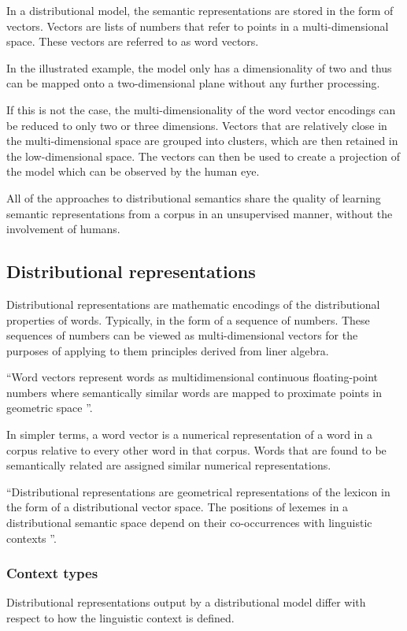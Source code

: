 \documentclass[14pt, a4paper]{extreport}
\begin{document}
In a distributional model, the semantic representations are stored in the form of vectors. Vectors are lists of numbers that refer to points in a multi-dimensional space. These vectors are referred to as word vectors.

In the illustrated example, the model only has a dimensionality of two and thus can be mapped onto a two-dimensional plane without any further processing.

If this is not the case, the multi-dimensionality of the word vector encodings can be reduced to only two or three dimensions. Vectors that are relatively close in the multi-dimensional space are grouped into clusters, which are then retained in the low-dimensional space. The vectors can then be used to create a projection of the model which can be observed by the human eye.

All of the approaches to distributional semantics share the quality of learning semantic representations from a corpus in an unsupervised manner, without the involvement of humans.
    \subsection{Distributional representations}
Distributional representations are mathematic encodings of the distributional properties of words. Typically, in the form of a sequence of numbers. These sequences of numbers can be viewed as multi-dimensional vectors for the purposes of applying to them principles derived from liner algebra.

``Word vectors represent words as multidimensional continuous floating-point numbers where semantically similar words are mapped to proximate points in geometric space \parencite{ahireintro}''.

In simpler terms, a word vector is a numerical representation of a word in a corpus relative to every other word in that corpus. Words that are found to be semantically related are assigned similar numerical representations.

``Distributional representations are geometrical representations of the lexicon in the form of a distributional vector space. The positions of lexemes in a distributional semantic space depend on their co-occurrences with linguistic contexts \parencite{lenci}''.
      \subsubsection{Context types}
Distributional representations output by a distributional model differ with respect to how the linguistic context is defined.
\end{document}
